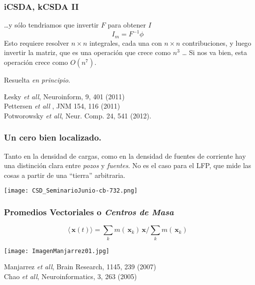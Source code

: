 \documentclass{beamer}
\newcommand{\xq}{\, \mathbf{x}}
\begin{document}
\begin{frame}
  \frametitle{iCSDA, kCSDA II}
  \ldots y sólo tendriamos que invertir $F$ para obtener $I$
  \begin{equation}
    I_m=F^{-1}\phi 
  \end{equation}
  Esto requiere resolver $n\times n$ integrales, cada una con
  $n\times n$ contribuciones, y luego invertir la matriz, que es una operación
  que crece como $n^3$ \ldots
  Si nos va bien, esta operación crece como $O(n^7)$.

  Resuelta \emph{en principio}.

 \begin{flushright}
  {\tiny  Łesky \emph{ et all}, Neuroinform, 9, 401 (2011) \\
      Pettersen \emph{et all} , JNM  154, 116 (2011) \\
      Potworowsky \emph{et all}, Neur. Comp. 24, 541 (2012). }
  \end{flushright}
\end{frame}



\begin{frame}
\frametitle{Un cero bien localizado.} 
Tanto en la densidad de cargas, como en la densidad de fuentes de corriente
hay una distinción clara entre \emph{pozos} y \emph{fuentes}.
No es el caso para el LFP, que mide las cosas a partir de una ``tierra''
arbitraria. 
\begin{center}
    \texttt{[image: CSD\_SeminarioJunio-cb-732.png]}
\end{center}
\end{frame}

\begin{frame}
  \frametitle{Promedios Vectoriales o \emph{Centros de Masa}}
  \begin{equation}
    \langle \xq(t) \rangle=\sum_k m(\xq_k)\xq/\sum_k m(\xq_k)
  \end{equation}
  
  \begin{center}
    \texttt{[image: ImagenManjarrez01.jpg]}
  \end{center} 
  
 \begin{flushright}
  {\tiny  Manjarrez \emph{ et all}, Brain Research, 1145, 239 (2007) \\
      Chao \emph{ et all}, Neuroinformatics, 3, 263 (2005) }
  \end{flushright}

\end{frame}
\end{document}
